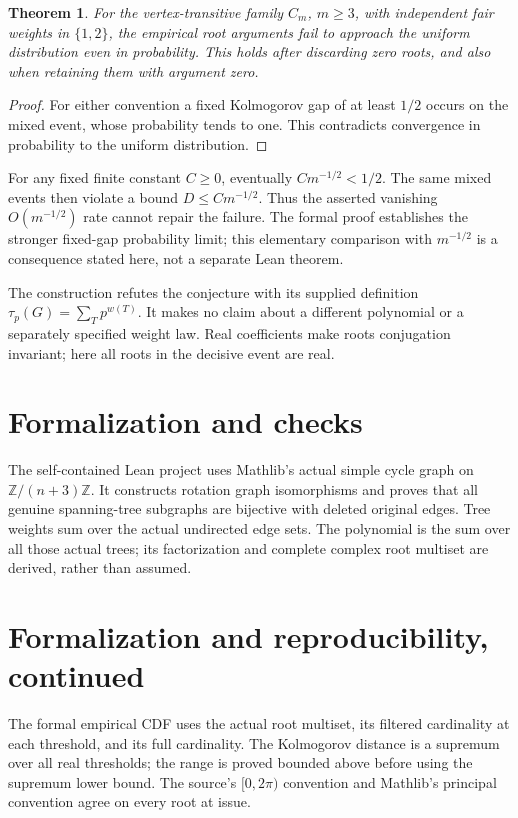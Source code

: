 \documentclass[11pt]{article}
\newtheorem{theorem}{Theorem}
\begin{document}
\begin{theorem}
For the vertex-transitive family $C_m$, $m\geq3$, with
independent fair weights in $\{1,2\}$, the empirical root
arguments fail to approach the uniform distribution even
in probability. This holds after discarding zero roots,
and also when retaining them with argument zero.
\end{theorem}
\begin{proof}
For either convention a fixed Kolmogorov gap of at least
$1/2$ occurs on the mixed event, whose probability tends
to one. This contradicts convergence in probability to
the uniform distribution.
\end{proof}
For any fixed finite constant $C\geq0$, eventually
$C m^{-1/2}<1/2$. The same mixed events then violate a
bound $D\leq C m^{-1/2}$. Thus the asserted vanishing
$O(m^{-1/2})$ rate cannot repair the failure. The formal
proof establishes the stronger fixed-gap probability
limit; this elementary comparison with $m^{-1/2}$ is a
consequence stated here, not a separate Lean theorem.

The construction refutes the conjecture with its supplied
definition $\tau_p(G)=\sum_T p^{w(T)}$. It makes no claim
about a different polynomial or a separately specified
weight law. Real coefficients make roots conjugation
invariant; here all roots in the decisive event are real.

\section*{Formalization and checks}
The self-contained Lean project uses Mathlib's actual simple
cycle graph on $\mathbb Z/(n+3)\mathbb Z$. It constructs
rotation graph isomorphisms and proves that all genuine
spanning-tree subgraphs are bijective with deleted original
edges. Tree weights sum over the actual undirected edge
sets. The polynomial is the sum over all those actual trees;
its factorization and complete complex root multiset are
derived, rather than assumed.

\newpage
\section*{Formalization and reproducibility, continued}
The formal empirical CDF uses the actual root multiset,
its filtered cardinality at each threshold, and its full
cardinality. The Kolmogorov distance is a supremum over
all real thresholds; the range is proved bounded above
before using the supremum lower bound. The source's
$[0,2\pi)$ convention and Mathlib's principal convention
agree on every root at issue.
\end{document}
